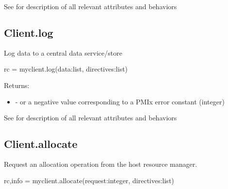 See  for description of all relevant attributes and behaviors


\subsection{Client.log}

\summary

Log data to a central data service/store

\format

\pyspecificstart
\begin{codepar}
rc = myclient.log(data:list, directives:list)
\end{codepar}
\pyspecificend

\begin{arglist}
\end{arglist}

Returns:

\begin{itemize}
    \item {} -  or a negative value corresponding to a PMIx error constant (integer)
\end{itemize}


See  for description of all relevant attributes and behaviors


\subsection{Client.allocate}

\summary

Request an allocation operation from the host resource manager.

\format

\pyspecificstart
\begin{codepar}
rc,info = myclient.allocate(request:integer, directives:list)
\end{codepar}
\pyspecificend

\begin{arglist}
\end{arglist}

